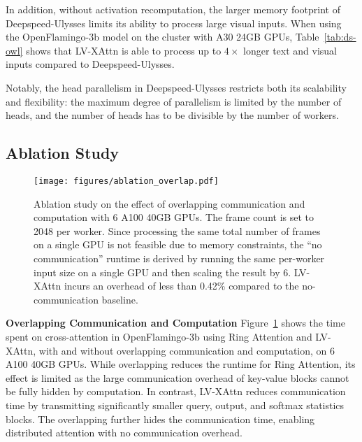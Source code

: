In addition, without activation recomputation, the larger memory footprint of Deepspeed-Ulysses limits its ability to process large visual inputs. When using the OpenFlamingo-3b model on the cluster with A30 24GB GPUs, Table~\ref{tab:ds-owl} shows that LV-XAttn is able to process up to $4\times$ longer text and visual inputs compared to Deepspeed-Ulysses.

Notably, the head parallelism in Deepspeed-Ulysses restricts both its scalability and flexibility: the maximum degree of parallelism is limited by the number of heads, and the number of heads has to be divisible by the number of workers.
\subsection{Ablation Study}
\label{sec:eval/ablation}
\begin{figure}[t]
    \centering
    \texttt{[image: figures/ablation\_overlap.pdf]}
    \caption{Ablation study on the effect of overlapping communication and computation with 6 A100 40GB GPUs. The frame count is set to 2048 per worker. Since processing the same total number of frames on a single GPU is not feasible due to memory constraints, the ``no communication'' runtime is derived by running the same per-worker input size on a single GPU and then scaling the result by 6. LV-XAttn incurs an overhead of less than 0.42\% compared to the no-communication baseline.}
    \label{fig:ablation_overlap}
\end{figure}
\textbf{Overlapping Communication and Computation} Figure~\ref{fig:ablation_overlap} shows the time spent on cross-attention in OpenFlamingo-3b using Ring Attention and LV-XAttn, with and without overlapping communication and computation, on 6 A100 40GB GPUs. While overlapping reduces the runtime for Ring Attention, its effect is limited as the large communication overhead of key-value blocks cannot be fully hidden by computation. In contrast, LV-XAttn reduces communication time by transmitting significantly smaller query, output, and softmax statistics blocks. The overlapping further hides the communication time, enabling distributed attention with no communication overhead.


